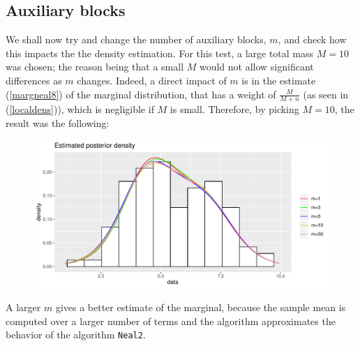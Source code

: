 \subsection{Auxiliary blocks}
We shall now try and change the number of auxiliary blocks, $m$, and check how this impacts the the density estimation.
For this test, a large total mass $M=10$ was chosen; the reason being that a small $M$ would not allow significant differences as $m$ changes.
Indeed, a direct impact of $m$ is in the estimate (\ref{margneal8}) of the marginal distribution, that has a weight of $\frac{M}{M+n}$ (as seen in (\ref{localdens})), which is negligible if $M$ is small.
Therefore, by picking $M=10$, the result was the following:
\begin{figure}[h]
	\centering
	\includegraphics[scale=0.6]{etc/dens_withmM10.pdf}
\end{figure}

A larger $m$ gives a better estimate of the marginal, because the sample mean is computed over a larger number of terms and the algorithm approximates the behavior of the algorithm \verb|Neal2|.

\clearpage

